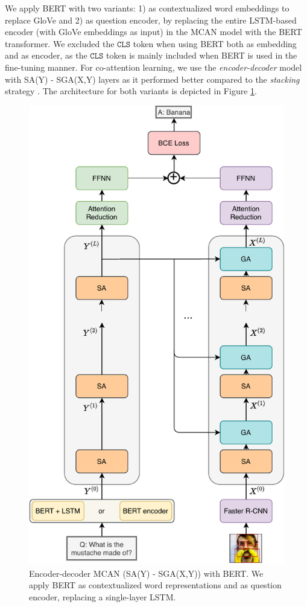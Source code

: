 \documentclass{article}
\begin{document}
We apply BERT with two variants: 1) as contextualized word embeddings to replace GloVe and 2) as question encoder, by replacing the entire LSTM-based encoder (with GloVe embeddings as input) in the MCAN model with the BERT transformer. We excluded the $\mathtt{CLS}$ token when using BERT both as embedding and as encoder, as the $\mathtt{CLS}$ token is mainly included when BERT is used in the fine-tuning manner. For co-attention learning, we use the \textit{encoder-decoder} model with SA(Y) - SGA(X,Y) layers as it performed better compared to the \textit{stacking} strategy \citep{yu2019mcan}. The architecture for both variants is depicted in Figure \ref{fig:mcan_bert}.

\begin{figure}[ht]
	\centering
	\includegraphics[scale=0.7]{enc-dec_mcan_bert}
	\caption{Encoder-decoder MCAN (SA(Y) - SGA(X,Y)) with BERT. We apply BERT as contextualized word representations and as question encoder, replacing a single-layer LSTM.}
	\label{fig:mcan_bert}
\end{figure}
\end{document}
